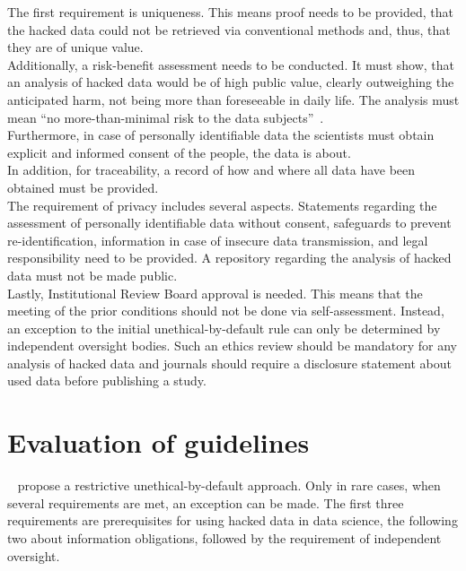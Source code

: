 The first requirement is uniqueness.
This means proof needs to be provided, that the hacked data could not be retrieved via conventional methods and, thus, that they are of unique value.\\
Additionally, a risk-benefit assessment needs to be conducted.
It must show, that an analysis of hacked data would be of high public value, clearly outweighing the anticipated harm, not being more than foreseeable in daily life.
The analysis must mean ``no more-than-minimal risk to the data subjects''~\parencite[][747]{nature}.\\
Furthermore, in case of personally identifiable data the scientists must obtain explicit and informed consent of the people, the data is about.\\
In addition, for traceability, a record of how and where all data have been obtained must be provided.\\
The requirement of privacy includes several aspects.
Statements regarding the assessment of personally identifiable data without consent, safeguards to prevent re-identification, information in case of insecure data transmission, and legal responsibility need to be provided.
A repository regarding the analysis of hacked data must not be made public.\\
Lastly, Institutional Review Board approval is needed.
This means that the meeting of the prior conditions should not be done via self-assessment.
Instead, an exception to the initial unethical-by-default rule can only be determined by independent oversight bodies.
Such an ethics review should be mandatory for any analysis of hacked data and journals should require a disclosure statement about used data before publishing a study.

\section*{Evaluation of guidelines}

~\textcite{nature} propose a restrictive unethical-by-default approach.
Only in rare cases, when several requirements are met, an exception can be made.
The first three requirements are prerequisites for using hacked data in data science, the following two about information obligations, followed by the requirement of independent oversight.

